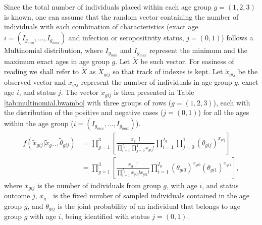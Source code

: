 Since the total number of individuals placed within each age group $g=(1,2,3)$ is known, one can assume that the random vector containing the number of
individuals with each combination of characteristics (exact age $i=(I_{g_{min}},\dots,I_{g_{max}})$ and infection or seropositivity status, $j=(0,1)$) follows a Multinomial distribution, where $I_{g_{min}}$ and $I_{g_{max}}$ represent the minimum and the maximum exact ages in age group $g$.
Let $\tilde{X}$ be such vector.
For easiness of reading we shall refer to $\tilde{X}$ as $\tilde{X}_{gij}$ so that track of indexes is kept.
Let $\tilde{x}_{gij}$ be the observed vector and $x_{gij}$ represent the number of individuals in age group $g$, exact age $i$, and status $j$.
The vector $\tilde{x}_{gij}$ is then presented in Table \ref{tab:multinomial.bwambo} with three groups of rows ($g=(1,2,3)$), each with the distribution of the positive and negative cases ($j=(0,1)$) for all the ages within the age group ($i=(I_{g_{min}},\dots,I_{g_{max}})$).
%
\begin{equation}
    \label{eq:multinomial.product}
    \begin{split}
    f(\tilde{x}_{gij} | \tilde{x}_{g\cdot\cdot}, \tilde{\theta}_{gij}) & = \prod_{g=1}^3 \left[ \frac{x_{g\cdot\cdot}!}{\prod_{i=1}^{I_g} \prod_{j=0}^1 x_{gij}!} \prod_{i=1}^{I_g} \prod_{j=0}^1 (\theta_{gij})^{x_{gij}} \right] \\
    & = \prod_{g=1}^3 \left[\frac{x_{g\cdot\cdot}!}{\prod_{i=1}^{I_g} x_{gi0}!x_{gi1}!} \prod_{i=1}^{I_g} (\theta_{gi0})^{x_{gi0}} (\theta_{gi1})^{x_{gi1}} \right],
    \end{split}
\end{equation}
%
\noindent
where $x_{gij}$ is the number of individuals from group $g$, with age $i$, and status outcome $j$, $x_{g\cdot\cdot}$ is the fixed number of sampled individuals contained in the age group $g$, and $\theta_{gij}$ is the joint probability of an individual that belongs to age group $g$ with age $i$, being identified with status $j=(0,1)$.

